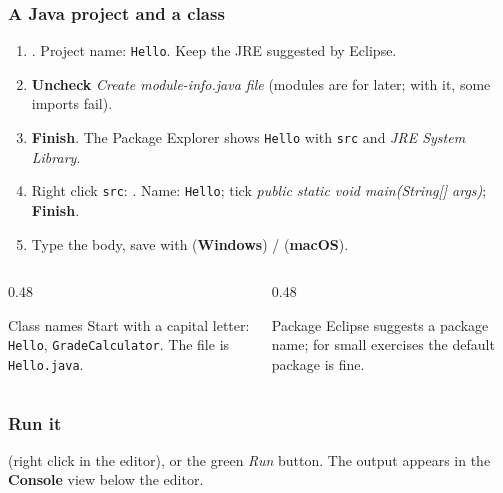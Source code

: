 \documentclass[aspectratio=169,10pt,compress]{beamer}
\newcommand{\win}{\textbf{Windows}}
\newcommand{\mac}{\textbf{macOS}}
\begin{document}
\begin{frame}[t,fragile] \frametitle{A Java project and a class}
  \begin{enumerate}\small
    \item {}. Project name: \texttt{Hello}. Keep the JRE suggested by Eclipse.
    \item \textbf{Uncheck} \emph{Create module-info.java file} (modules are for later; with it, some imports fail).
    \item \textbf{Finish}. The Package Explorer shows \texttt{Hello} with \texttt{src} and \emph{JRE System Library}.
    \item Right click \texttt{src}: . Name: \texttt{Hello}; tick
          \emph{public static void main(String[] args)}; \textbf{Finish}.
    \item Type the body, save with  (\win) /  (\mac).
  \end{enumerate}
  \vspace{0.3em}
  \begin{columns}[T]
    \begin{column}{0.48\textwidth}
      \begin{block}{Class names}
        \small Start with a capital letter: \texttt{Hello}, \texttt{GradeCalculator}. The file is \texttt{Hello.java}.
      \end{block}
    \end{column}
    \begin{column}{0.48\textwidth}
      \begin{block}{Package}
        \small Eclipse suggests a package name; for small exercises the default package is fine.
      \end{block}
    \end{column}
  \end{columns}
\end{frame}




\begin{frame}[t,fragile] \frametitle{Run it}

  \vspace{0.2em}
  \small {} (right click in the editor), or the green \emph{Run} button.
  The output appears in the \textbf{Console} view below the editor.
\end{frame}
\end{document}
